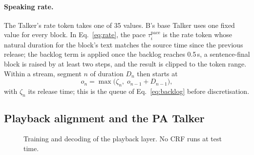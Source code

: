 \paragraph{Speaking rate.} The Talker's rate token takes one of 35 values. B's base Talker uses one fixed value for
every block. In Eq.~\eqref{eq:rate}, the pace $\tau^{\mathrm{pace}}_i$ is the rate token whose natural duration for the
block's text matches the source time since the previous release; the backlog term is applied once the backlog reaches
0.5\,s, a sentence-final block is raised by at least two steps, and the result is clipped to the token range. Within a
stream, segment $n$ of duration $D_n$ then starts at
\begin{equation}
o_n=\max\big(\zeta_n,\;o_{n-1}+D_{n-1}\big),
\label{eq:layout}
\end{equation}
with $\zeta_n$ its release time; this is the queue of Eq.~\eqref{eq:backlog} before discretisation.

\subsection{Playback alignment and the PA Talker}
\label{app:plem}
\label{app:train-pa}

\begin{figure}[!htbp]
\small
{}
\caption{Training and decoding of the playback layer. No CRF runs at test time.}
\label{alg:pa}
\end{figure}

